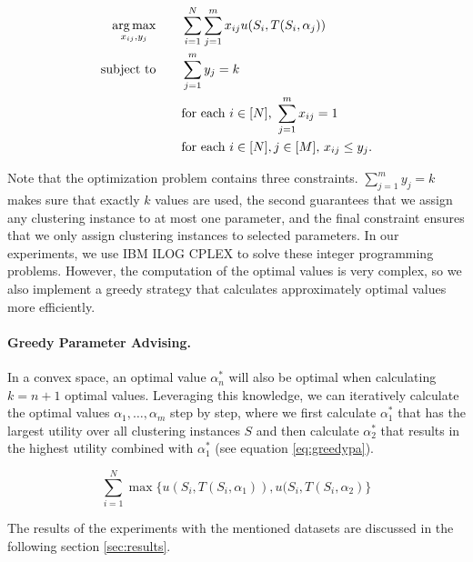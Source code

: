 \begin{align*}
  \operatorname*{arg\,max}_{x_{ij}, y_j} \qquad&\sum_{i = 1}^N \sum_{j = 1}^m x_{ij} u(S_i, T(S_i, \alpha_j)) \\
  \text{subject to} \qquad& \sum_{j=1}^m y_j = k \\
  & \text{for each $i \in [N]$, } \sum_{j=1}^m x_{ij} = 1 \\
  & \text{for each $i \in [N], j \in [M]$, } x_{ij} \leq y_j.
\end{align*}

Note that the optimization problem contains three constraints. $\sum_{j=1}^m y_j = k$ makes sure that exactly $k$ values are used, the second guarantees that we assign any clustering instance to at most one parameter, and the final constraint ensures that we only assign clustering instances to selected parameters. In our experiments, we use IBM ILOG CPLEX to solve these integer programming problems. However, the computation of the optimal values is very complex, so we also implement a greedy strategy that calculates approximately optimal values more efficiently.

\paragraph{Greedy Parameter Advising.} In a convex space, an optimal value $\alpha_n^*$ will also be optimal when calculating $k = n + 1$ optimal values. Leveraging this knowledge, we can iteratively calculate the optimal values $\alpha_1, \dots, \alpha_m$ step by step, where we first calculate $\alpha_1^*$ that has the largest utility over all clustering instances $S$ and then calculate $\alpha_2^*$ that results in the highest utility combined with $\alpha_1^*$ (see equation \ref{eq:greedypa}).

\begin{equation}
\sum_{i=1}^N \max\{u(S_i, T(S_i, \alpha_1)), u(S_i, T(S_i, \alpha_2)\} 
\label{eq:greedypa}
\end{equation}

The results of the experiments with the mentioned datasets are discussed in the following section \ref{sec:results}.